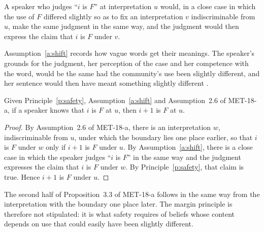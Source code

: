 \documentclass{situationist-preprint}
\begin{document}
\begin{assumption}\label{a:shift}
A speaker who judges \enquote{$i$ is $F$} at interpretation $u$ would, in a close case in which the use of $F$ differed slightly so as to fix an interpretation $v$ indiscriminable from $u$, make the same judgment in the same way, and the judgment would then express the claim that $i$ is $F$ under $v$.
\end{assumption}

Assumption~\ref{a:shift} records how vague words get their meanings. The speaker's grounds for the judgment, her perception of the case and her competence with the word, would be the same had the community's use been slightly different, and her sentence would then have meant something slightly different \citep[ch.~8]{Williamson1994}.

\begin{proposition}\label{p:margins}
Given Principle~\ref{p:safety}, Assumption~\ref{a:shift} and Assumption~2.6 of MET-18-a, if a speaker knows that $i$ is $F$ at $u$, then $i+1$ is $F$ at $u$.
\end{proposition}

\begin{proof}
By Assumption~2.6 of MET-18-a, there is an interpretation $w$, indiscriminable from $u$, under which the boundary lies one place earlier, so that $i$ is $F$ under $w$ only if $i+1$ is $F$ under $u$. By Assumption~\ref{a:shift}, there is a close case in which the speaker judges \enquote{$i$ is $F$} in the same way and the judgment expresses the claim that $i$ is $F$ under $w$. By Principle~\ref{p:safety}, that claim is true. Hence $i+1$ is $F$ under $u$.
\end{proof}

The second half of Proposition~3.3 of MET-18-a follows in the same way from the interpretation with the boundary one place later. The margin principle is therefore not stipulated: it is what safety requires of beliefs whose content depends on use that could easily have been slightly different.
\end{document}
